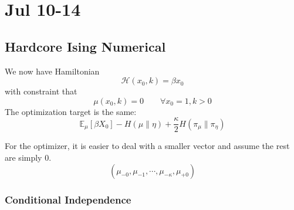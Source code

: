 \documentclass[12pt]{article}
\numberwithin{equation}{section}
\begin{document}
\newpage

\section{Jul 10-14}

\subsection{Hardcore Ising Numerical}
We now have Hamiltonian
\begin{equation}
    \mathcal{H}(x_0, k) = \beta x_0
\end{equation}
with constraint that
\begin{equation}
    \mu(x_0, k) = 0 \qquad \forall x_0=1, k>0
\end{equation}
The optimization target is the same:
\begin{equation*}
    \mathbb{E}_\mu[\beta X_0] - H(\mu \| \eta) + \frac\kappa2 H(\pi_\mu \| \pi_\eta)
\end{equation*}

For the optimizer, it is easier to deal with a smaller vector and assume the rest are simply 0.
\begin{equation*}
    (\mu_{-0}, \mu_{-1}, \cdots, \mu_{-\kappa}, \mu_{+0})
\end{equation*}

\subsubsection{Conditional Independence}
\end{document}
